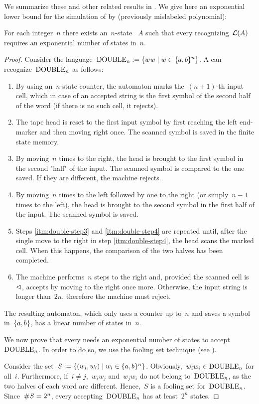 We summarize these and other related results in .
We give here an exponential lower bound for the simulation of \OMODLAs by \ONFAs (previously mislabeled polynomial):
\begin{thrm}\label{thm:OM1DLAto1NFAlower}
	For each integer~$n$ there exists an~$n$-state \OMODLA~$A$ such that every \ONFA recognizing~$\mathcal L(A)$ requires an exponential number of states in~$n$.
\end{thrm}
\begin{proof}
	Consider the language~$\mathrm{DOUBLE}_n:=\{ww\mid w\in\{a,b\}^n\}$.
	A \OMODLA can recognize~$\mathrm{DOUBLE}_n$ as follows:
	\begin{enumerate}
		\item By using an~$n$-state counter, the automaton marks the~$(n+1)$-th input cell, which in case of an accepted string is the first symbol of the second half of the word (if there is no such cell, it rejects).
		\item The tape head is reset to the first input symbol by first reaching the left end-marker and then moving right once. The scanned symbol is saved in the finite state memory.
		\item\label{itm:double-step3} By moving~$n$ times to the right, the head is brought to the first symbol in the second "half" of the input. The scanned symbol is compared to the one saved.
		      If they are different, the machine rejects.
		\item\label{itm:double-step4} By moving~$n$ times to the left followed by one to the right (or simply~$n-1$ times to the left), the head is brought to the second symbol in the first half of the input. The scanned symbol is saved.
		\item Steps \ref{itm:double-step3} and \ref{itm:double-step4} are repeated until, after the single move to the right in step \ref{itm:double-step4}, the head scans the marked cell. When this happens, the comparison of the two halves has been completed.
		\item The machine performs~$n$ steps to the right and, provided the scanned cell is~$\lhd$, accepts by moving to the right once more.
		      Otherwise, the input string is longer than~$2n$, therefore the machine must reject.
	\end{enumerate}
	The resulting automaton, which only uses a counter up to~$n$ and saves a symbol in~$\{a,b\}$, has a linear number of states in~$n$.

	We now prove that every \ONFA needs an exponential number of states to accept~$\mathrm{DOUBLE}_n$.
	In order to do so, we use the fooling set technique (see ).

	Consider the set~$S:=\{(w_i,w_i)\mid w_i\in\{a,b\}^n\}$.
	Obviously,~$w_iw_i\in\mathrm{DOUBLE}_n$ for all~$i$.
	Furthermore, if~$i\ne j$,~$w_iw_j$ and~$w_jw_i$ do not belong to~$\mathrm{DOUBLE}_n$, as the two halves of each word are different.
	Hence,~$S$ is a fooling set for~$\mathrm{DOUBLE}_n$.
	Since~$\# S=2^n$, every \ONFA accepting~$\mathrm{DOUBLE}_n$ has at least~$2^n$ states.
\end{proof}
